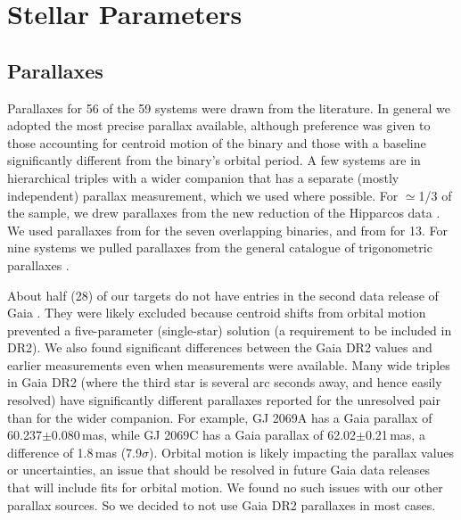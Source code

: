 \documentclass[twocolumn]{aastex62}
\begin{document}
\section{Stellar Parameters}\label{sec:params}

\subsection{Parallaxes}\label{sec:plx}

Parallaxes for 56 of the 59 systems were drawn from the literature. In general we adopted the most precise parallax available, although preference was given to those accounting for centroid motion of the binary and those with a baseline significantly different from the binary's orbital period. A few systems are in hierarchical triples with a wider companion that has a separate (mostly independent) parallax measurement, which we used where possible. For $\simeq$1/3 of the sample, we drew parallaxes from the new reduction of the Hipparcos data \citep{van-Leeuwen:2007yq}. We used parallaxes from \citet{Dupuy2017} for the seven overlapping binaries, and from \citet{Benedict2016} for 13. For nine systems we pulled parallaxes from the general catalogue of trigonometric parallaxes \citep{van-Altena1995}.  

About half (28) of our targets do not have entries in the second data release of Gaia \citep[DR2, ][]{GaiaDr2,2018arXiv180409365G}. They were likely excluded because centroid shifts from orbital motion prevented a five-parameter (single-star) solution (a requirement to be included in DR2). We also found significant differences between the Gaia DR2 values and earlier measurements \citep[including from TGAS, ][]{2015A&A...574A.115M,gaiadr1} even when measurements were available. Many wide triples in Gaia DR2 (where the third star is several arc seconds away, and hence easily resolved) have significantly different parallaxes reported for the unresolved pair than for the wider companion. For example, GJ 2069A has a Gaia parallax of 60.237$\pm$0.080\,mas, while GJ 2069C has a Gaia  parallax of 62.02$\pm$0.21\,mas, a difference of 1.8\,mas (7.9$\sigma$). Orbital motion is likely impacting the parallax values or uncertainties, an issue that should be resolved in future Gaia data releases that will include fits for orbital motion. We found no such issues with our other parallax sources. So we decided to not use Gaia DR2 parallaxes in most cases. 
\end{document}
